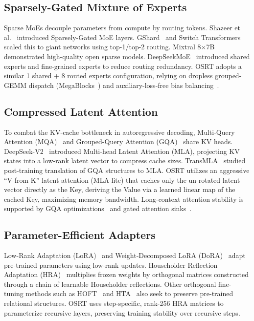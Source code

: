 \documentclass[11pt,twocolumn]{article}
\begin{document}
\subsection{Sparsely-Gated Mixture of Experts}
Sparse MoEs decouple parameters from compute by routing tokens. Shazeer et al.~\cite{shazeer2017} introduced Sparsely-Gated MoE layers. GShard~\cite{gshard2020} and Switch Transformers~\cite{switch2021} scaled this to giant networks using top-1/top-2 routing. Mixtral 8$\times$7B~\cite{mixtral2024} demonstrated high-quality open sparse models. DeepSeekMoE~\cite{deepseekmoe2024} introduced shared experts and fine-grained experts to reduce routing redundancy. OSRT adopts a similar 1 shared + 8 routed experts configuration, relying on dropless grouped-GEMM dispatch (MegaBlocks~\cite{megablocks2022}) and auxiliary-loss-free bias balancing~\cite{wang2024,han2025}.

\subsection{Compressed Latent Attention}
To combat the KV-cache bottleneck in autoregressive decoding, Multi-Query Attention (MQA)~\cite{shazeer2019} and Grouped-Query Attention (GQA)~\cite{ainslie2023} share KV heads. DeepSeek-V2~\cite{deepseekv2} introduced Multi-head Latent Attention (MLA), projecting KV states into a low-rank latent vector to compress cache sizes. TransMLA~\cite{transmla2025} studied post-training translation of GQA structures to MLA. OSRT utilizes an aggressive ``V-from-K'' latent attention (MLA-lite) that caches only the un-rotated latent vector directly as the Key, deriving the Value via a learned linear map of the cached Key, maximizing memory bandwidth. Long-context attention stability is supported by GQA optimizations~\cite{chen2025gqa} and gated attention sinks~\cite{xiao2023,qiu2025}.

\subsection{Parameter-Efficient Adapters}
Low-Rank Adaptation (LoRA)~\cite{hu2021} and Weight-Decomposed LoRA (DoRA)~\cite{liu2024} adapt pre-trained parameters using low-rank updates. Householder Reflection Adaptation (HRA)~\cite{hra2024,yuan2024} multiplies frozen weights by orthogonal matrices constructed through a chain of learnable Householder reflections. Other orthogonal fine-tuning methods such as HOFT~\cite{hoft2025} and HTA~\cite{hta2024} also seek to preserve pre-trained relational structures. OSRT uses step-specific, rank-256 HRA matrices to parameterize recursive layers, preserving training stability over recursive steps.
\end{document}
